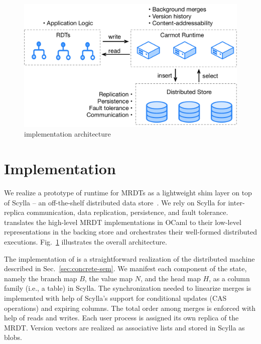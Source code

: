 \begin{figure}[ht]
  \centering
    \includegraphics[scale=0.35]{Figures/implementation2}
\caption{\quark implementation architecture}
\label{fig:implementation}
  \vspace*{-0.2in}
\end{figure}

\section{Implementation}
\label{sec:implementation}

We realize a prototype of \quark runtime for MRDTs as a lightweight
shim layer on top of Scylla -- an off-the-shelf distributed data
store~\cite{scylla}. We rely on Scylla for inter-replica
communication, data replication, persistence, and fault tolerance.
\quark translates the high-level MRDT implementations in OCaml to
their low-level representations in the backing store and orchestrates
their well-formed distributed executions.
Fig.~\ref{fig:implementation} illustrates the overall architecture.

The implementation of \quark is a straightforward realization of the
\quark distributed machine described in Sec.~\ref{sec:concrete-sem}.
We manifest each component of the state, namely the branch map $B$,
the value map $N$, and the head map $H$, as a column family (i.e., a
table) in Scylla. The synchronization needed to linearize merges is
implemented with help of Scylla's support for conditional updates (CAS
operations) and expiring columns. The total order among merges is
enforced with help of  reads and writes. Each user process
is assigned its own replica of the MRDT.  Version vectors are realized
as associative lists and stored in Scylla as blobs.

